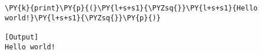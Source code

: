 \begin{Verbatim}[label=\makebox{\url{https://github.com/lucabaldini/cmepda/tree/master/slides/latex/snippets/hello\_world.py}},commandchars=\\\{\}]
\PY{k}{print}\PY{p}{(}\PY{l+s+s1}{\PYZsq{}}\PY{l+s+s1}{Hello world!}\PY{l+s+s1}{\PYZsq{}}\PY{p}{)}

[Output]
Hello world!
\end{Verbatim}
